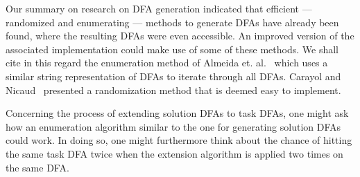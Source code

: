 Our summary on research on DFA generation indicated that efficient --- randomized and enumerating --- methods to generate DFAs have already been found, where the resulting DFAs were even accessible. An improved version of the associated implementation could make use of some of these methods. We shall cite in this regard the enumeration method of Almeida et. al.~\cite{AAA09} which uses a similar string representation of DFAs to iterate through all DFAs. Carayol and Nicaud~\cite{CN12} presented a randomization method that is deemed easy to implement.

Concerning the process of extending solution DFAs to task DFAs, one might ask how an enumeration algorithm similar to the one for generating solution DFAs could work. In doing so, one might furthermore think about the chance of hitting the same task DFA twice when the extension algorithm is applied two times on the same DFA.
